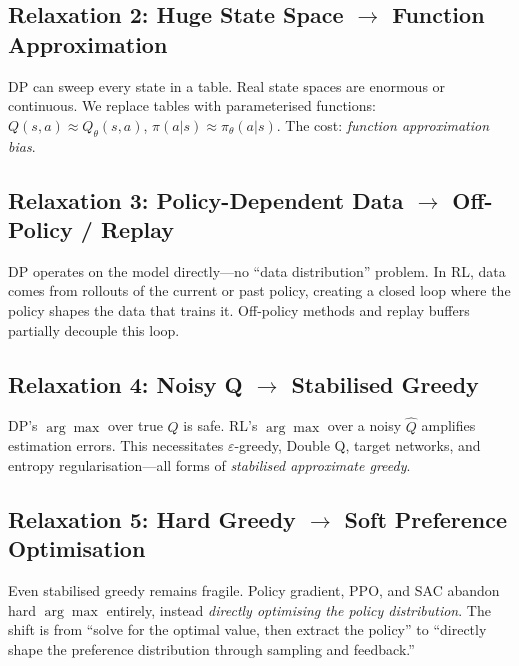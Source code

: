 \subsection{Relaxation 2: Huge State Space $\to$ Function Approximation}

DP can sweep every state in a table.
Real state spaces are enormous or continuous.
We replace tables with parameterised functions:
$Q(s,a)\approx Q_\theta(s,a)$, $\pi(a|s)\approx\pi_\theta(a|s)$.
The cost: \emph{function approximation bias}.

\subsection{Relaxation 3: Policy-Dependent Data $\to$ Off-Policy / Replay}

DP operates on the model directly---no ``data distribution'' problem.
In RL, data comes from rollouts of the current or past policy, creating a closed loop where the policy shapes the data that trains it.
Off-policy methods and replay buffers partially decouple this loop.

\subsection{Relaxation 4: Noisy Q $\to$ Stabilised Greedy}

DP's $\arg\max$ over true $Q$ is safe.
RL's $\arg\max$ over a noisy $\hat{Q}$ amplifies estimation errors.
This necessitates $\varepsilon$-greedy, Double Q, target networks, and entropy regularisation---all forms of \emph{stabilised approximate greedy}.

\subsection{Relaxation 5: Hard Greedy $\to$ Soft Preference Optimisation}

Even stabilised greedy remains fragile.
Policy gradient, PPO, and SAC abandon hard $\arg\max$ entirely, instead \emph{directly optimising the policy distribution}.
The shift is from ``solve for the optimal value, then extract the policy'' to ``directly shape the preference distribution through sampling and feedback.''

